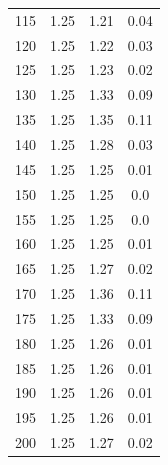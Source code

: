 \begin{table}
\begin{center}
\begin{tabular}{c|ccc}
115 & 1.25 & 1.21 & 0.04\\
120 & 1.25 & 1.22 & 0.03\\
125 & 1.25 & 1.23 & 0.02\\
130 & 1.25 & 1.33 & 0.09\\
135 & 1.25 & 1.35 & 0.11\\
140 & 1.25 & 1.28 & 0.03\\
145 & 1.25 & 1.25 & 0.01\\
150 & 1.25 & 1.25 & 0.0\\
155 & 1.25 & 1.25 & 0.0\\
160 & 1.25 & 1.25 & 0.01\\
165 & 1.25 & 1.27 & 0.02\\
170 & 1.25 & 1.36 & 0.11\\
175 & 1.25 & 1.33 & 0.09\\
180 & 1.25 & 1.26 & 0.01\\
185 & 1.25 & 1.26 & 0.01\\
190 & 1.25 & 1.26 & 0.01\\
195 & 1.25 & 1.26 & 0.01 \\
200 & 1.25 & 1.27 & 0.02
\end{tabular}
\end{center}
\end{table}

